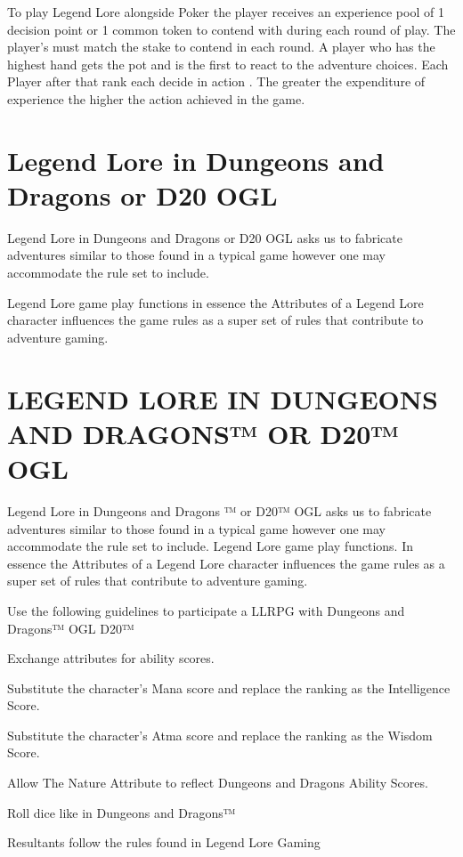 \documentclass{article}
\begin{document}
	To play Legend Lore alongside Poker the player receives an experience pool of 1 decision point or 1 common token to contend with during each round of play. The player's must match the stake to contend in each round.  A player who has the highest hand gets the pot and is the first to react to the adventure choices. Each Player after that rank each decide in action . The greater the expenditure of experience the higher the action achieved in the game.
    
 \section{Legend Lore in Dungeons and Dragons or D20 OGL}

Legend Lore in Dungeons and Dragons or D20 OGL asks us to fabricate adventures similar to those found in a typical game however one may accommodate the rule set to include. 

Legend Lore game play functions in essence the Attributes of a Legend Lore character influences the game rules as a super set of rules that contribute to adventure gaming.



\section{LEGEND LORE IN DUNGEONS AND DRAGONS™ OR D20™ OGL}

	Legend Lore in Dungeons and Dragons ™ or D20™ OGL asks us to fabricate adventures similar
to those found in a typical game however one may accommodate the rule set to include. Legend
Lore game play functions. In essence the Attributes of a Legend Lore character influences the
game rules as a super set of rules that contribute to adventure gaming.

	Use the following guidelines to participate a LLRPG with Dungeons and Dragons™ OGL
D20™

Exchange attributes for ability scores.

Substitute the character’s Mana score and replace the ranking as the Intelligence Score.

Substitute the character’s Atma score and replace the ranking as the Wisdom Score.

Allow The Nature Attribute to reflect Dungeons and Dragons Ability Scores.

Roll dice like in Dungeons and Dragons™

Resultants follow the rules found in Legend Lore Gaming
\end{document}
